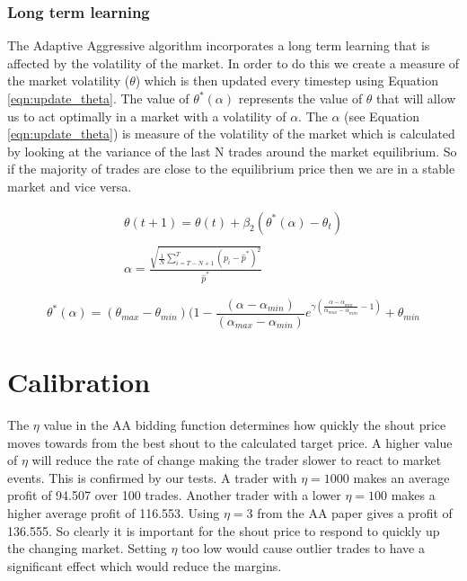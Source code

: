 \documentclass[preprint]{acm_proc_article-sp} %
\begin{document}
\subsubsection{Long term learning} \label{sec:AA_long_term_learning}
The Adaptive Aggressive algorithm incorporates a long term learning that is
affected by the volatility of the market. In order to do this we create a
measure of the market volatility ($\theta$) which is then updated every
timestep using Equation \ref{eqn:update_theta}. The value of $\theta^*(\alpha)$
represents the value of $\theta$ that will allow us to act optimally in a
market with a volatility of $\alpha$.  The $\alpha$ (see Equation
\ref{eqn:update_theta}) is measure of the volatility of the market which is calculated
by looking at the variance of the last N trades around the market equilibrium.
So if the majority of trades are close to the equilibrium price then we are in
a stable market and vice versa.

\begin{equation}
    \label{eqn:update_theta}
    \begin{split}
        \theta(t+1)=\theta(t)+\beta_2(\theta^*(\alpha)-\theta_t)\\\\
        \alpha = \frac{\sqrt{\frac 1 N \sum^T_{i=T-N+1}(p_i-\hat p^*)^2}}{\hat p^*}
    \end{split}
\end{equation}

\begin{equation}
    \label{eqn:theta_star}
    \theta^*(\alpha) = (\theta_{max}-\theta_{min})
    (1-\frac{(\alpha-\alpha_{min})}{(\alpha_{max} -\alpha_{min})}e^{\gamma(
    \frac{\alpha-\alpha_{min}}{\alpha_{max}-\alpha_{min}}-1)} + \theta_{min}
\end{equation}

\section{Calibration} \label{sec:calibration}
The $\eta$ value in the AA bidding function determines how quickly the shout
price moves towards from the best shout to the calculated target price. A
higher value of $\eta$ will reduce the rate of change making the trader slower
to react to market events. This is confirmed by our tests. A trader with $\eta
= 1000$ makes an average profit of 94.507 over 100 trades. Another trader with
a lower $\eta = 100$ makes a higher average profit of 116.553. Using $\eta = 3$
from the AA paper gives a profit of 136.555. So clearly it is important for the
shout price to respond to quickly up the changing market. Setting $\eta$ too
low would cause outlier trades to have a significant effect which would reduce
the margins.
\end{document}
